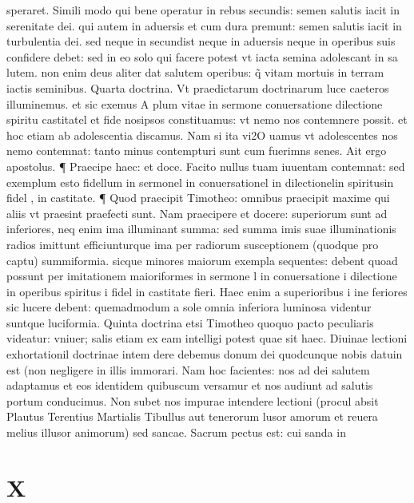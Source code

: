 \documentclass{article}
\begin{document}
\begin{pages}
speraret. Simili modo qui bene operatur in rebus secundis: semen salutis iacit in serenitate dei. qui autem in aduersis et cum dura premunt: semen salutis iacit in turbulentia dei. sed neque in secundist neque in aduersis neque in operibus suis confidere debet: sed in eo solo qui facere potest vt iacta semina adolescant in sa lutem. non enim deus aliter dat salutem operibus: q̃ vitam mortuis in terram iactis seminibus. Quarta doctrina. Vt praedictarum doctrinarum luce caeteros illuminemus. et sic exemus A plum vitae in sermone conuersatione dilectione spiritu castitatel et fide nosipsos constituamus: vt nemo nos contemnere possit. et hoc etiam ab adolescentia discamus. Nam si ita vi2O uamus vt adolescentes nos nemo contemnat: tanto minus contempturi sunt cum fuerimns senes. Ait ergo apostolus. ¶ Praecipe haec: et doce. Facito nullus tuam iuuentam contemnat:  sed exemplum esto fidellum in sermonel in conuersationel in dilectionelin spiritusin fidel , in castitate. ¶ Quod praecipit Timotheo: omnibus praecipit maxime qui aliis vt praesint praefecti sunt. Nam praecipere et docere: superiorum sunt ad inferiores, neq enim ima illuminant summa: sed summa imis suae illuminationis radios imittunt efficiunturque ima per radiorum susceptionem (quodque pro captu) summiformia. sicque minores maiorum exempla sequentes: debent quoad possunt per imitationem maioriformes in sermone l in conuersatione i dilectione in operibus spiritus i fidel in castitate fieri. Haec enim a superioribus i ine feriores sic lucere debent: quemadmodum a sole omnia inferiora luminosa videntur suntque  luciformia. Quinta doctrina etsi Timotheo quoquo pacto peculiaris videatur: vniuer; salis etiam ex eam intelligi potest quae sit haec. Diuinae lectioni exhortationil doctrinae intem dere debemus donum dei quodcunque nobis datuin est (non negligere in illis immorari. Nam hoc facientes: nos ad dei salutem adaptamus et eos identidem quibuscum versamur et nos audiunt ad salutis portum conducimus. Non subet nos impurae intendere lectioni (procul absit Plautus Terentius Martialis Tibullus aut tenerorum lusor amorum et reuera melius illusor animorum) sed sancae. Sacrum pectus est: cui sanda in  \pend
\section*{X }

\end{pages}
\end{document}
